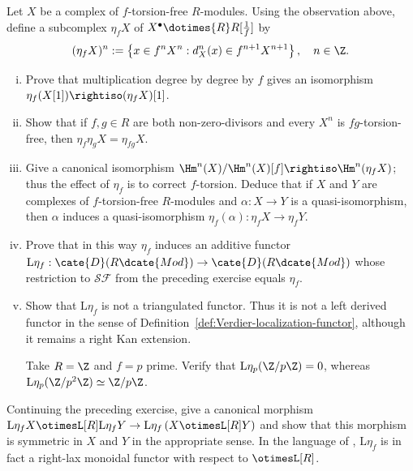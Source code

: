 \begin{Exercises}
	Let $X$ be a complex of $f$-torsion-free $R$-modules. Using the observation
	above, define a subcomplex $\eta_fX$ of
	$X^\bullet\dotimes{R}R[\frac{1}{f}]$ by
	\[ (\eta_f X)^n := \left\{ x \in f^n X^n : d_X^n(x) \in f^{n+1} X^{n+1} \right\}, \quad n \in \Z . \]
	\begin{enumerate}[(i)]
		\item Prove that multiplication degree by degree by $f$ gives an
		isomorphism $\eta_f(X[1])\rightiso(\eta_fX)[1]$.
		\item Show that if $f,g\in R$ are both non-zero-divisors and every $X^n$
		is $fg$-torsion-free, then $\eta_f\eta_gX=\eta_{fg}X$.
		\item Give a canonical isomorphism
		$\Hm^n(X)/\Hm^n(X)[f]\rightiso\Hm^n(\eta_fX)$; thus the effect of
		$\eta_f$ is to correct $f$-torsion. Deduce that if $X$ and $Y$ are
		complexes of $f$-torsion-free $R$-modules and $\alpha:X\to Y$ is a
		quasi-isomorphism, then $\alpha$ induces a quasi-isomorphism
		$\eta_f(\alpha):\eta_fX\to\eta_fY$.
		\item Prove that in this way $\eta_f$ induces an additive functor
		$\mathrm{L}\eta_f:\cate{D}(R\dcate{Mod})\to\cate{D}(R\dcate{Mod})$
		whose restriction to $\mathcal{SF}$ from the preceding exercise equals
		$\eta_f$.
		\item Show that $\mathrm{L}\eta_f$ is not a triangulated functor. Thus it
		is not a left derived functor in the sense of
		Definition~\ref{def:Verdier-localization-functor}, although it remains a
		right Kan extension.

		\begin{hint}
			Take $R=\Z$ and $f=p$ prime. Verify that
			$\mathrm{L}\eta_p(\Z/p\Z)=0$, whereas
			$\mathrm{L}\eta_p(\Z/p^2\Z)\simeq\Z/p\Z$.
		\end{hint}
	\end{enumerate}

	\item Continuing the preceding exercise, give a canonical morphism
	$\mathrm{L}\eta_f X \otimesL[R] \mathrm{L}\eta_f Y \to
	\mathrm{L}\eta_f\left( X \otimesL[R] Y \right)$ and show that this
	morphism is symmetric in $X$ and $Y$ in the appropriate sense. In the
	language of \cite[Remark 3.1.8]{Li1}, $\mathrm{L}\eta_f$ is in fact a
	right-lax monoidal functor with respect to $\otimesL[R]$.
\end{Exercises}
